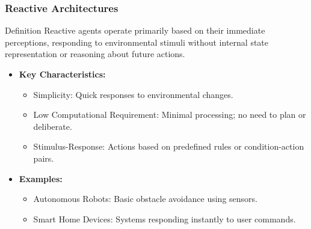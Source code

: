 \documentclass[aspectratio=169]{beamer}
\begin{document}
\begin{frame}[fragile]
    \frametitle{Reactive Architectures}
    \begin{block}{Definition}
        Reactive agents operate primarily based on their immediate perceptions, responding to environmental stimuli without internal state representation or reasoning about future actions.
    \end{block}

    \begin{itemize}
        \item \textbf{Key Characteristics:}
        \begin{itemize}
            \item Simplicity: Quick responses to environmental changes.
            \item Low Computational Requirement: Minimal processing; no need to plan or deliberate.
            \item Stimulus-Response: Actions based on predefined rules or condition-action pairs.
        \end{itemize}

        \item \textbf{Examples:}
        \begin{itemize}
            \item Autonomous Robots: Basic obstacle avoidance using sensors.
            \item Smart Home Devices: Systems responding instantly to user commands.
        \end{itemize}
    \end{itemize}
\end{frame}
\end{document}
